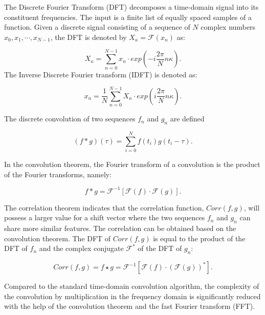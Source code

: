\documentclass[letterpaper, 10 pt, conference]{ieeeconf}  %
\begin{document}
The Discrete Fourier Transform (DFT) decomposes a time-domain signal into its constituent frequencies. The input is a finite list of equally spaced samples of a function. Given a discrete signal consisting of a sequence of $N$ complex numbers $x_{0},x_{1},\cdots,x_{N-1}$, the DFT is denoted by $X_{\kappa} = \mathcal{F}({x_{n}})$ as:

\begin{equation}\label{equ21}
    X_{\kappa} = \sum_{n=0}^{N-1}x_{n}\cdot exp(-i\frac{2\pi}{N}n\kappa).
\end{equation}
The Inverse Discrete Fourier transform (IDFT) is denoted as:

\begin{equation}\label{equ22}
    x_{n} = \frac{1}{N}\sum_{n=0}^{N-1}X_{\kappa}\cdot exp(i\frac{2\pi}{N}n\kappa).
\end{equation}

The discrete convolution of two sequences $f_{n}$ and $g_{n}$  are defined

\begin{equation}\label{equ23}
    (f \ast g)(\tau)=\sum_{i=0}^{N}f(t_{i})g(t_{i}-\tau).
\end{equation}

In the convolution theorem, the Fourier transform of a convolution is the product of the Fourier transforms, namely:

\begin{equation}\label{equ24}
    f \ast g = \mathcal{F}^{-1} [\mathcal{F}(f) \cdot \mathcal{F}(g)].
\end{equation}

The correlation theorem indicates that the correlation function, $Corr(f,g)$, will possess a larger value for a shift vector where the two sequences $f_n$ and $g_n$ can share more similar features. The correlation can be obtained based on the convolution theorem. The DFT of $Corr(f,g)$ is equal to the product of the DFT of $f_{n}$ and the complex conjugate $\mathcal{F}^{*}$ of the DFT of $g_n$:

\begin{equation}\label{equ25}
    Corr(f,g)=f \star g = \mathcal{F}^{-1}[\mathcal{F}(f) \cdot (\mathcal{F}(g))^{*}].
\end{equation}

Compared to the standard time-domain convolution algorithm, the complexity of the convolution by multiplication in the frequency domain is significantly reduced with the help of the convolution theorem and the fast Fourier transform (FFT).
\end{document}
